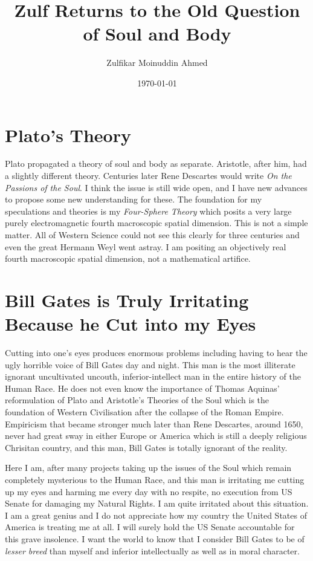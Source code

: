 \documentclass{amsart}
\title{Zulf Returns to the Old Question of Soul and Body}
\author{Zulfikar Moinuddin Ahmed}
\date{\today}
\begin{document}
\maketitle

\section{Plato's Theory}

Plato propagated a theory of soul and body as separate.  Aristotle, after him, had a slightly different theory.  Centuries later Rene Descartes would write {\em On the Passions of the Soul}.  I think the issue is still wide open, and I have new advances to propose some new understanding for these.  The foundation for my speculations and theories is my {\em Four-Sphere Theory} which posits a very large purely electromagnetic fourth macroscopic spatial dimension.  This is not a simple matter.  All of Western Science could not see this clearly for three centuries and even the great Hermann Weyl went astray.  I am positing an objectively real fourth macroscopic spatial dimension, not a mathematical artifice.

\section{Bill Gates is Truly Irritating Because he Cut into my Eyes}

Cutting into one's eyes produces enormous problems including having to hear the ugly horrible voice of Bill Gates day and night.  This man is the most illiterate ignorant uncultivated uncouth, inferior-intellect man in the entire history of the Human Race.  He does not even know the importance of Thomas Aquinas' reformulation of Plato and Aristotle's Theories of the Soul which is the foundation of Western Civilisation after the collapse of the Roman Empire.  Empiricism that became stronger much later than Rene Descartes, around 1650, never had great sway in either Europe or America which is still a deeply religious Chrisitan country, and this man, Bill Gates is totally ignorant of the reality.  

Here I am, after many projects taking up the issues of the Soul which remain completely mysterious to the Human Race, and this man is irritating me cutting up my eyes and harming me every day with no respite, no execution from US Senate for damaging my Natural Rights.  I am quite irritated about this situation.  I am a great genius and I do not appreciate how my country the United States of America is treating me at all.  I will surely hold the US Senate accountable for this grave insolence.  I want the world to know that I consider Bill Gates to be of {\em lesser breed} than myself and inferior intellectually as well as in moral character.  
\end{document}
